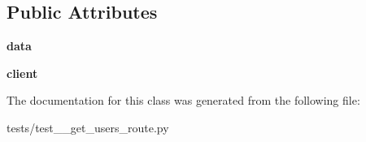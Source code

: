 \subsection*{Public Attributes}
\begin{DoxyCompactItemize}
\item 
\mbox{\label{classtests_1_1test__3__get__users__route_1_1_test_user_routes_ac6fba83ba73ba6582958e1c9ae4e9a80}} 
{\bfseries data}
\item 
\mbox{\label{classtests_1_1test__3__get__users__route_1_1_test_user_routes_aaaf32e7922e7a0148aea1f7564f30601}} 
{\bfseries client}
\end{DoxyCompactItemize}


The documentation for this class was generated from the following file\+:\begin{DoxyCompactItemize}
\item 
tests/test\+\_\+\_\+get\+\_\+users\+\_\+route.\+py\end{DoxyCompactItemize}
